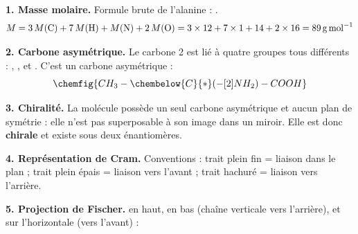 \documentclass[11pt]{article}
\begin{document}
\begin{corrige}
\textbf{1. Masse molaire.} Formule brute de l'alanine  : .
\[ M = 3\,M(\ce{C}) + 7\,M(\ce{H}) + M(\ce{N}) + 2\,M(\ce{O}) = 3\times 12 + 7\times 1 + 14 + 2\times 16 = \SI{89}{g.mol^{-1}} \]

\textbf{2. Carbone asymétrique.} Le carbone 2 est lié à quatre groupes tous différents : , ,  et . C'est un carbone asymétrique :
\[ \chemfig{CH_3-\chembelow{C}{*}(-[2]NH_2)-COOH} \]

\textbf{3. Chiralité.} La molécule possède un seul carbone asymétrique et aucun plan de symétrie : elle n'est pas superposable à son image dans un miroir. Elle est donc \textbf{chirale} et existe sous deux énantiomères.

\textbf{4. Représentation de Cram.} Conventions : trait plein fin = liaison dans le plan ; trait plein épais = liaison vers l'avant ; trait hachuré = liaison vers l'arrière.
\begin{center}
\end{center}

\textbf{5. Projection de Fischer.}  en haut,  en bas (chaîne verticale vers l'arrière),  et  sur l'horizontale (vers l'avant) :
\begin{center}
\end{center}


\end{corrige}
\end{document}
